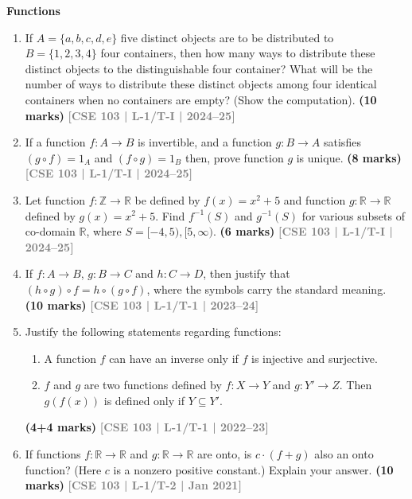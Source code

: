 \documentclass[12pt,a3paper]{article}
\newcommand{\yr}[1]{\hfill\textcolor{gray}{\small\textbf{[#1]}}}
\newcommand{\mk}[1]{\textcolor{orange!70!black}{\small\textbf{(#1 marks)}}}
\newcommand{\subtopic}[2]{%
  \vspace{10pt}
  \noindent\begin{tcolorbox}[colback=#1!8,colframe=#1,boxrule=0.6pt,arc=4pt,
    left=6pt,right=6pt,top=4pt,bottom=4pt]
    \small\bfseries\textcolor{#1}{#2}
  \end{tcolorbox}
  \vspace{2pt}
}
\begin{document}
\subtopic{cB}{Functions}
\label{sub:s3-functions}

\begin{enumerate} 

\item If $A = \{a,b,c,d,e\}$ five distinct objects are to be distributed to $B = \{1,2,3,4\}$ four containers, then how many ways to distribute these distinct objects to the distinguishable four container? What will be the number of ways to distribute these distinct objects among four identical containers when no containers are empty? (Show the computation).
\mk{10} \yr{CSE 103 | L-1/T-I | 2024--25}

\item If a function $f: A \rightarrow B$ is invertible, and a function $g: B \rightarrow A$ satisfies $(g \circ f) = 1_A$ and $(f \circ g) = 1_B$ then, prove function $g$ is unique.
\mk{8} \yr{CSE 103 | L-1/T-I | 2024--25}

\item Let function $f: \mathbb{Z} \rightarrow \mathbb{R}$ be defined by $f(x) = x^2 + 5$ and function $g: \mathbb{R} \rightarrow \mathbb{R}$ defined by $g(x) = x^2 + 5$. Find $f^{-1}(S)$ and $g^{-1}(S)$ for various subsets of co-domain $\mathbb{R}$, where $S = [-4,5), [5,\infty)$.
\mk{6} \yr{CSE 103 | L-1/T-I | 2024--25}


\item If $f: A \to B$, $g: B \to C$ and $h: C \to D$, then justify that $(h \circ g) \circ f = h \circ (g \circ f)$, where the symbols carry the standard meaning.
\mk{10} \yr{CSE 103 | L-1/T-1 | 2023--24}

\item Justify the following statements regarding functions:
\begin{enumerate}
  \item A function $f$ can have an inverse only if $f$ is injective and surjective.
  \item $f$ and $g$ are two functions defined by $f: X \to Y$ and $g: Y' \to Z$. Then $g(f(x))$ is defined only if $Y \subseteq Y'$.
\end{enumerate}
\mk{4+4} \yr{CSE 103 | L-1/T-1 | 2022--23}

\item If functions $f: \mathbb{R} \to \mathbb{R}$ and $g: \mathbb{R} \to \mathbb{R}$ are onto, is $c \cdot (f + g)$ also an onto function? (Here $c$ is a nonzero positive constant.) Explain your answer.
\mk{10} \yr{CSE 103 | L-1/T-2 | Jan 2021}



\end{enumerate}
\end{document}
